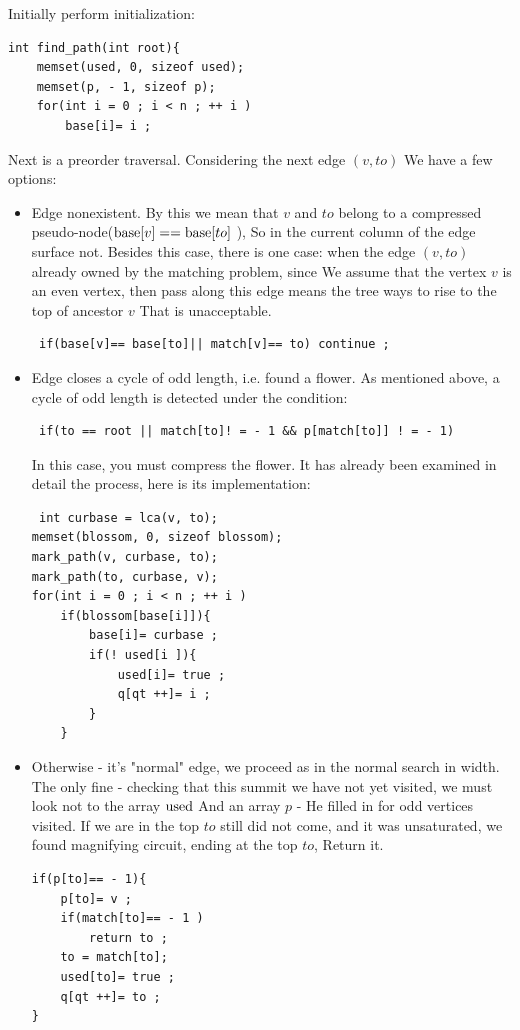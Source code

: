 Initially perform initialization:

\begin{verbatim}
int find_path(int root){
    memset(used, 0, sizeof used);
    memset(p, - 1, sizeof p);
    for(int i = 0 ; i < n ; ++ i )
        base[i]= i ; 
\end{verbatim}
Next is a preorder traversal. Considering the next edge $(v, to)$ We have a few options:

\begin{itemize}

\item Edge nonexistent. By this we mean that $v$ and $to$ belong to a compressed pseudo-node(${\rm base} [v] == {\rm base} [to]$ ), So in the current column of the edge surface not. Besides this case, there is one case: when the edge $(v, to)$ already owned by the matching problem, since We assume that the vertex $v$ is an even vertex, then pass along this edge means the tree ways to rise to the top of ancestor $v$ That is unacceptable.

\begin{verbatim}
 if(base[v]== base[to]|| match[v]== to) continue ; 
\end{verbatim}
\item Edge closes a cycle of odd length, i.e. found a flower. As mentioned above, a cycle of odd length is detected under the condition:

\begin{verbatim}
 if(to == root || match[to]! = - 1 && p[match[to]] ! = - 1)
\end{verbatim}
In this case, you must compress the flower. It has already been examined in detail the process, here is its implementation:

\begin{verbatim}
 int curbase = lca(v, to);
memset(blossom, 0, sizeof blossom);
mark_path(v, curbase, to);
mark_path(to, curbase, v);
for(int i = 0 ; i < n ; ++ i )
    if(blossom[base[i]]){
        base[i]= curbase ;
        if(! used[i ]){
            used[i]= true ;
            q[qt ++]= i ;
        }
    } 
\end{verbatim}
\item Otherwise - it's "normal" edge, we proceed as in the normal search in width. The only fine - checking that this summit we have not yet visited, we must look not to the array $\rm used$ And an array $p$ - He filled in for odd vertices visited. If we are in the top $to$ still did not come, and it was unsaturated, we found magnifying circuit, ending at the top $to$, Return it.

\begin{verbatim}
if(p[to]== - 1){
    p[to]= v ;
    if(match[to]== - 1 )
        return to ;
    to = match[to];
    used[to]= true ;
    q[qt ++]= to ;
} 
\end{verbatim}
\end{itemize}

